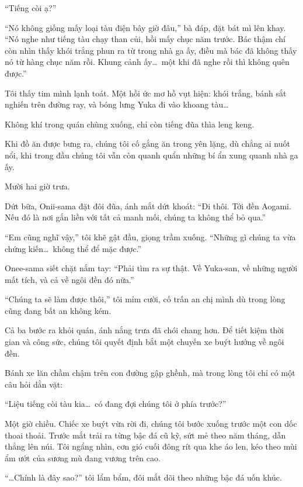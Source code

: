 \documentclass[../main.tex]{subfiles}
\begin{document}
``Tiếng còi ạ?''

``Nó không giống mấy loại tàu điện bây giờ đâu,'' bà đáp, đặt bát mì lên khay. ``Nó nghe như tiếng tàu chạy than củi, hồi mấy chục năm trước. Bác thậm chí còn nhìn thấy khói trắng phun ra từ trong nhà ga ấy, điều mà bác đã không thấy nó từ hàng chục năm rồi. Khung cảnh ấy\dots\ một khi đã nghe rồi thì không quên được.''

Tôi thấy tim mình lạnh toát. Một hồi ức mơ hồ vụt hiện: khói trắng, bánh sắt nghiến trên đường ray, và bóng lưng Yuka đi vào khoang tàu\dots

Không khí trong quán chùng xuống, chỉ còn tiếng đũa thìa leng keng.

Khi đồ ăn được bưng ra, chúng tôi cố gắng ăn trong yên lặng, dù chẳng ai nuốt nổi, khi trong đầu chúng tôi vẫn còn quanh quẩn những bí ẩn xung quanh nhà ga ấy.

\ct

Mười hai giờ trưa.

Dứt bữa, Onii-sama đặt đôi đũa, ánh mắt dứt khoát: ``Đi thôi. Tới đền Aogami. Nếu đó là nơi gắn liền với tất cả manh mối, chúng ta không thể bỏ qua.''

``Em cũng nghĩ vậy,'' tôi khẽ gật đầu, giọng trầm xuống. ``Những gì chúng ta vừa chứng kiến\dots\ không thể để mặc được.''

Onee-sama siết chặt nắm tay: ``Phải tìm ra sự thật. Về Yuka-san, về những người mất tích, và cả về ngôi đền đó nữa.''

``Chúng ta sẽ làm được thôi,'' tôi mỉm cười, cố trấn an chị mình dù trong lòng cũng đang bất an không kém.

Cả ba bước ra khỏi quán, ánh nắng trưa đã chói chang hơn. Để tiết kiệm thời gian và công sức, chúng tôi quyết định bắt một chuyến xe buýt hướng về ngôi đền.

Bánh xe lăn chầm chậm trên con đường gập ghềnh, mà trong lòng tôi chỉ có một câu hỏi dằn vặt:

``Liệu tiếng còi tàu kia\dots\ có đang đợi chúng tôi ở phía trước?''

\ct

Một giờ chiều. Chiếc xe buýt vừa rời đi, chúng tôi bước xuống trước một con dốc thoai thoải. Trước mắt trải ra từng bậc đá cũ kỹ, sứt mẻ theo năm tháng, dẫn thẳng lên núi. Tôi ngẩng nhìn, cơn gió cuối đông rít qua khe áo len, kéo theo mùi ẩm ướt của sương mù đang vương trên cao.

``\dots Chính là đây sao?'' tôi lẩm bẩm, đôi mắt dõi theo những bậc đá uốn khúc.
\end{document}
